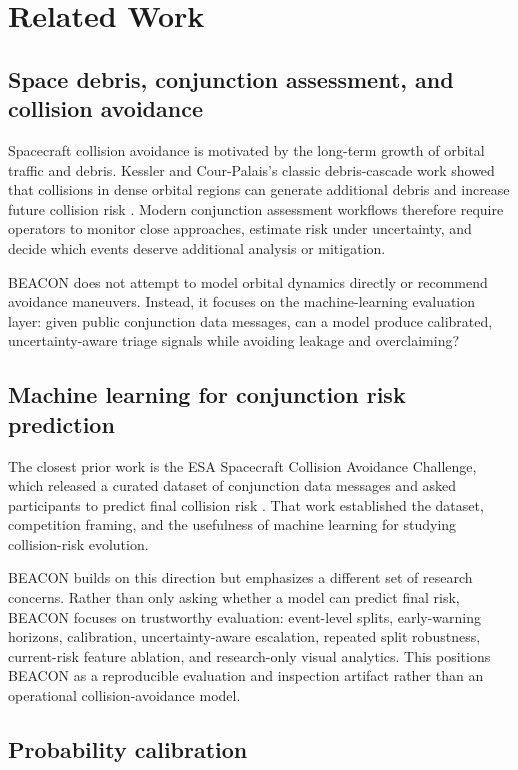 \documentclass[11pt]{article}
\begin{document}
\section{Related Work}

\subsection{Space debris, conjunction assessment, and collision avoidance}

Spacecraft collision avoidance is motivated by the long-term growth of orbital traffic and debris. Kessler and Cour-Palais's classic debris-cascade work showed that collisions in dense orbital regions can generate additional debris and increase future collision risk \citep{kessler1978collision}. Modern conjunction assessment workflows therefore require operators to monitor close approaches, estimate risk under uncertainty, and decide which events deserve additional analysis or mitigation.

BEACON does not attempt to model orbital dynamics directly or recommend avoidance maneuvers. Instead, it focuses on the machine-learning evaluation layer: given public conjunction data messages, can a model produce calibrated, uncertainty-aware triage signals while avoiding leakage and overclaiming?

\subsection{Machine learning for conjunction risk prediction}

The closest prior work is the ESA Spacecraft Collision Avoidance Challenge, which released a curated dataset of conjunction data messages and asked participants to predict final collision risk \citep{uriot2020spacecraft}. That work established the dataset, competition framing, and the usefulness of machine learning for studying collision-risk evolution.

BEACON builds on this direction but emphasizes a different set of research concerns. Rather than only asking whether a model can predict final risk, BEACON focuses on trustworthy evaluation: event-level splits, early-warning horizons, calibration, uncertainty-aware escalation, repeated split robustness, current-risk feature ablation, and research-only visual analytics. This positions BEACON as a reproducible evaluation and inspection artifact rather than an operational collision-avoidance model.

\subsection{Probability calibration}
\end{document}
